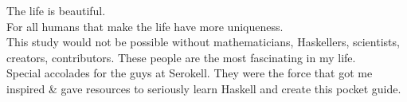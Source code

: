 \documentclass[a4paper,14pt,oneside]{book}
\begin{document}
The life is beautiful.\\
For all humans that make the life have more uniqueness.\\

This study would not be possible without mathematicians, Haskellers, scientists, creators, contributors. These people are the most fascinating in my life.\\

Special accolades for the guys at Serokell. They were the force that got me inspired \& gave resources to seriously learn Haskell and create this pocket guide.\\
\end{document}
